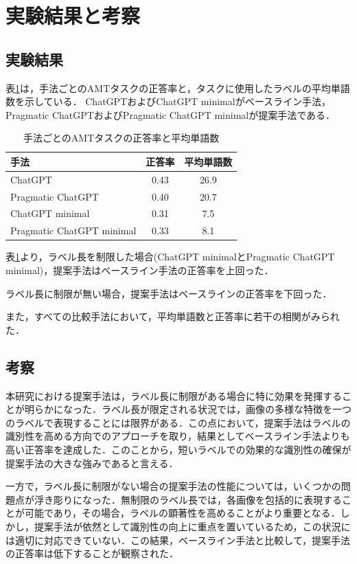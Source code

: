 \documentclass[a4paper,11pt]{jreport}
\begin{document}
\section{実験結果と考察}

\subsection{実験結果}

表\ref{tab:accuracy_result}は，手法ごとのAMTタスクの正答率と，タスクに使用したラベルの平均単語数を示している．
ChatGPTおよびChatGPT minimalがベースライン手法，Pragmatic ChatGPTおよびPragmatic ChatGPT minimalが提案手法である．

\begin{table}[H]
\centering
\begin{tabular}{lcc}
\hline
手法 & 正答率 & 平均単語数 \\
\hline
ChatGPT & 0.43 & 26.9 \\
Pragmatic ChatGPT & 0.40 & 20.7 \\
ChatGPT minimal & 0.31 & 7.5 \\
Pragmatic ChatGPT minimal & 0.33 & 8.1 \\
\hline
\end{tabular}
\caption{手法ごとのAMTタスクの正答率と平均単語数}
\label{tab:accuracy_result}
\end{table}

表\ref{tab:accuracy_result}より，ラベル長を制限した場合(ChatGPT minimalとPragmatic ChatGPT minimal)，提案手法はベースライン手法の正答率を上回った．

ラベル長に制限が無い場合，提案手法はベースラインの正答率を下回った．

また，すべての比較手法において，平均単語数と正答率に若干の相関がみられた．

\subsection{考察}
本研究における提案手法は，ラベル長に制限がある場合に特に効果を発揮することが明らかになった．ラベル長が限定される状況では，画像の多様な特徴を一つのラベルで表現することには限界がある．この点において，提案手法はラベルの識別性を高める方向でのアプローチを取り，結果としてベースライン手法よりも高い正答率を達成した．このことから，短いラベルでの効果的な識別性の確保が提案手法の大きな強みであると言える．

一方で，ラベル長に制限がない場合の提案手法の性能については，いくつかの問題点が浮き彫りになった．無制限のラベル長では，各画像を包括的に表現することが可能であり，その場合，ラベルの顕著性を高めることがより重要となる．しかし，提案手法が依然として識別性の向上に重点を置いているため，この状況には適切に対応できていない．この結果，ベースライン手法と比較して，提案手法の正答率は低下することが観察された．
\end{document}

